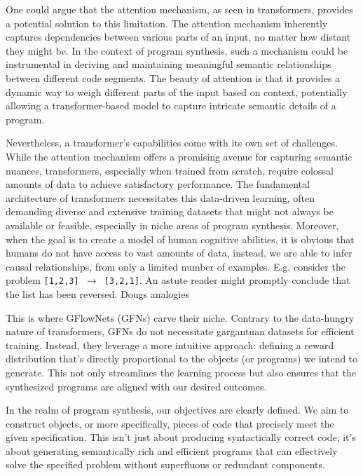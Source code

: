 One could argue that the attention mechanism, as seen in transformers, provides a potential solution to this limitation. The attention mechanism inherently captures dependencies between various parts of an input, no matter how distant they might be. In the context of program synthesis, such a mechanism could be instrumental in deriving and maintaining meaningful semantic relationships between different code segments. The beauty of attention is that it provides a dynamic way to weigh different parts of the input based on context, potentially allowing a transformer-based model to capture intricate semantic details of a program.

Nevertheless, a transformer's capabilities come with its own set of challenges. While the attention mechanism offers a promising avenue for capturing semantic nuances, transformers, especially when trained from scratch, require colossal amounts of data to achieve satisfactory performance. The fundamental architecture of transformers necessitates this data-driven learning, often demanding diverse and extensive training datasets that might not always be available or feasible, especially in niche areas of program synthesis. Moreover, when the goal is to create a model of human cognitive abilities, it is obvious that humans do not have access to vast amounts of data, instead, we are able to infer causal relationships, from only a limited number of examples. E.g. consider the problem \texttt{[1,2,3] $\rightarrow$ [3,2,1]}. An astute reader might promptly conclude that the list has been reversed. 
Dougs analogies 

This is where GFlowNets (GFNs) carve their niche. Contrary to the data-hungry nature of transformers, GFNs do not necessitate gargantuan datasets for efficient training. Instead, they leverage a more intuitive approach: defining a reward distribution that's directly proportional to the objects (or programs) we intend to generate. This not only streamlines the learning process but also ensures that the synthesized programs are aligned with our desired outcomes.

In the realm of program synthesis, our objectives are clearly defined. We aim to construct objects, or more specifically, pieces of code that precisely meet the given specification. This isn't just about producing syntactically correct code; it's about generating semantically rich and efficient programs that can effectively solve the specified problem without superfluous or redundant components.























